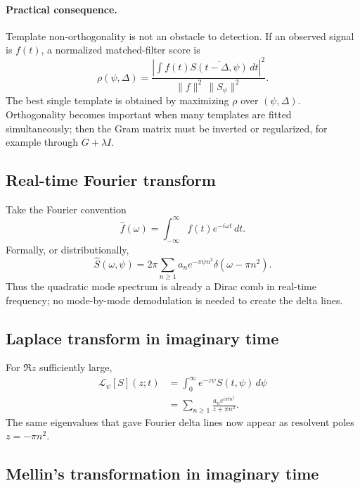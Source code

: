 \paragraph{Practical consequence.}
Template non-orthogonality is not an obstacle to detection.  If an observed signal is
$f(t)$, a normalized matched-filter score is
\begin{equation}
  \rho(\psi,\Delta)
  =\frac{\left|\int f(t)\overline{S(t-\Delta,\psi)}\,dt\right|^2}
  {\|f\|^2\,\|S_\psi\|^2}.
  \label{eq:theta-matched-filter}
\end{equation}
The best single template is obtained by maximizing $\rho$ over $(\psi,\Delta)$.
Orthogonality becomes important when many templates are fitted simultaneously; then the
Gram matrix must be inverted or regularized, for example through $G+\lambda I$.

\subsection{Real-time Fourier transform}

Take the Fourier convention
\begin{equation}
  \widehat f(\omega)=\int_{-\infty}^{\infty}f(t)e^{-i\omega t}\,dt.
\end{equation}
Formally, or distributionally,
\begin{equation}
  \widehat S(\omega,\psi)
  =2\pi\sum_{n\ge1}a_n e^{-\pi\psi n^2}
       \delta(\omega-\pi n^2).
  \label{eq:fourier-delta-spectrum}
\end{equation}
Thus the quadratic mode spectrum is already a Dirac comb in real-time frequency; no
mode-by-mode demodulation is needed to create the delta lines.

\subsection{Laplace transform in imaginary time}

For $\Re z$ sufficiently large,
\begin{align}
  \mathcal L_\psi[S](z;t)
   &=\int_0^\infty e^{-z\psi}S(t,\psi)\,d\psi \\
   &=\sum_{n\ge1}
      \frac{a_n e^{i\pi t n^2}}{z+\pi n^2}.
  \label{eq:laplace-resolvent}
\end{align}
The same eigenvalues that gave Fourier delta lines now appear as resolvent poles
$z=-\pi n^2$.

\subsection{Mellin's transformation in imaginary time}

